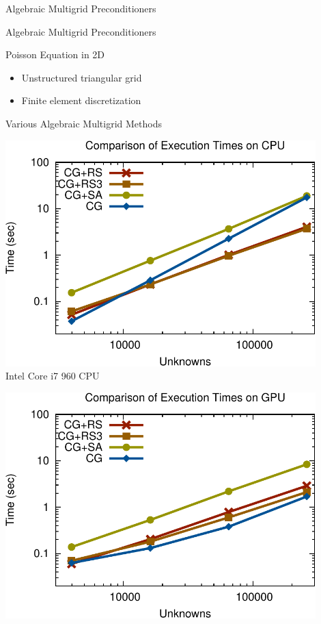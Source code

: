 \begin{frame}{Algebraic Multigrid Preconditioners}
  \vspace*{0.6cm}

\end{frame}

\begin{frame}{Algebraic Multigrid Preconditioners}

  \begin{block}{Poisson Equation in 2D}
    \begin{itemize}
     \item Unstructured triangular grid
     \item Finite element discretization
    \end{itemize}
  \end{block}

 \begin{block}{Various Algebraic Multigrid Methods}
  \vspace*{0.3cm}
  \begin{minipage}{0.48\textwidth}
  \begin{center}
   \includegraphics[width=0.9\textwidth]{figures/cpu_scaling-2.pdf}\\
   Intel Core i7 960 CPU
  \end{center}
  \end{minipage}
  \begin{minipage}{0.48\textwidth}
  \begin{center}
   \includegraphics[width=0.9\textwidth]{figures/gpu_scaling-2.pdf}\\

\end{center}
\end{minipage}
\end{block}
\end{frame}
